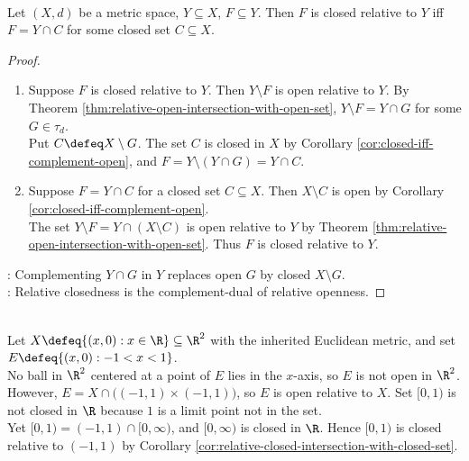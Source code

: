 \begin{corollary} \label{cor:relative-closed-intersection-with-closed-set} \\
Let $(X,d)$ be a metric space, $Y\subseteq X$, $F\subseteq Y$. Then $F$ is closed relative to $Y$ iff $F=Y\cap C$ for some closed set $C\subseteq X$.
\begin{proof}
\begin{enumerate}[label=\roman*.]
\setlength{\itemsep}{0pt}
\item[$(\Rightarrow)$] Suppose $F$ is closed relative to $Y$. Then $Y\setminus F$ is open relative to $Y$. By Theorem \ref{thm:relative-open-intersection-with-open-set}, $Y\setminus F=Y\cap G$ for some $G\in\tau_d$.\\
Put $C\defeq X\setminus G$. The set $C$ is closed in $X$ by Corollary \ref{cor:closed-iff-complement-open}, and $F=Y\setminus(Y\cap G)=Y\cap C$.
\item[$(\Leftarrow)$] Suppose $F=Y\cap C$ for a closed set $C\subseteq X$. Then $X\setminus C$ is open by Corollary \ref{cor:closed-iff-complement-open}.\\
The set $Y\setminus F=Y\cap(X\setminus C)$ is open relative to $Y$ by Theorem \ref{thm:relative-open-intersection-with-open-set}. Thus $F$ is closed relative to $Y$.
\end{enumerate}
: Complementing $Y\cap G$ in $Y$ replaces open $G$ by closed $X\setminus G$.\\
: Relative closedness is the complement-dual of relative openness.
\end{proof}
\end{corollary}

\begin{example} \label{ex:relative-topology-ambient-examples} \\
Let $X\defeq\{(x,0):x\in\R\}\subseteq\R^2$ with the inherited Euclidean metric, and set $E\defeq\{(x,0):-1<x<1\}$.\\
No ball in $\R^2$ centered at a point of $E$ lies in the $x$-axis, so $E$ is not open in $\R^2$.\\
However, $E=X\cap\bigl((-1,1)\times(-1,1)\bigr)$, so $E$ is open relative to $X$. Set $[0,1)$ is not closed in $\R$ because $1$ is a limit point not in the set.\\
Yet $[0,1)=(-1,1)\cap[0,\infty)$, and $[0,\infty)$ is closed in $\R$. Hence $[0,1)$ is closed relative to $(-1,1)$ by Corollary \ref{cor:relative-closed-intersection-with-closed-set}.
\end{example}
